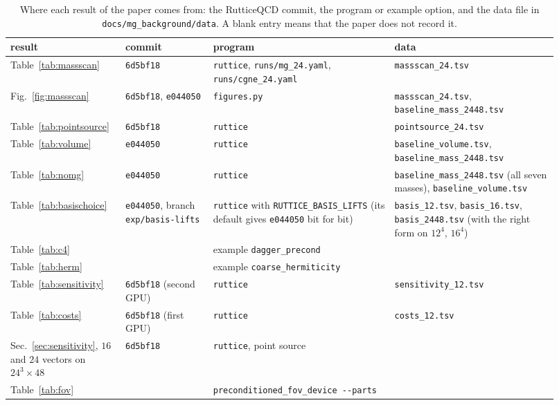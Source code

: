 \begin{table}[h]
\centering
\caption{Where each result of the paper comes from: the RutticeQCD commit, the program or
example option, and the data file in \texttt{docs/mg\_background/data}. A blank entry means
that the paper does not record it.}
\label{tab:provenance}
\footnotesize
\begin{tabular}{@{}>{\raggedright\arraybackslash}p{0.17\linewidth}>{\raggedright\arraybackslash}p{0.15\linewidth}>{\raggedright\arraybackslash}p{0.31\linewidth}>{\raggedright\arraybackslash}p{0.29\linewidth}@{}}
\toprule
result & commit & program & data\\
\midrule
Table~\ref{tab:massscan} & \texttt{6d5bf18} & \texttt{ruttice}, \texttt{runs/mg\_24.yaml}, \texttt{runs/cgne\_24.yaml} & \texttt{massscan\_24.tsv}\\
Fig.~\ref{fig:massscan} & \texttt{6d5bf18}, \texttt{e044050} & \texttt{figures.py} & \texttt{massscan\_24.tsv}, \texttt{baseline\_mass\_2448.tsv}\\
Table~\ref{tab:pointsource} & \texttt{6d5bf18} & \texttt{ruttice} & \texttt{pointsource\_24.tsv}\\
Table~\ref{tab:volume} & \texttt{e044050} & \texttt{ruttice} & \texttt{baseline\_volume.tsv}, \texttt{baseline\_mass\_2448.tsv}\\
Table~\ref{tab:nomg} & \texttt{e044050} & \texttt{ruttice} & \texttt{baseline\_mass\_2448.tsv} (all seven masses), \texttt{baseline\_volume.tsv}\\
Table~\ref{tab:basischoice} & \texttt{e044050}, branch \texttt{exp/\allowbreak basis-lifts} & \texttt{ruttice} with \texttt{RUTTICE\_\allowbreak BASIS\_\allowbreak LIFTS} (its default gives \texttt{e044050} bit for bit) & \texttt{basis\_12.tsv}, \texttt{basis\_16.tsv}, \texttt{basis\_2448.tsv} (with the right form on $12^4$, $16^4$)\\
Table~\ref{tab:c4} & & example \texttt{dagger\_precond} & \\
Table~\ref{tab:herm} & & example \texttt{coarse\_hermiticity} & \\
Table~\ref{tab:sensitivity} & \texttt{6d5bf18} (second GPU) & \texttt{ruttice} & \texttt{sensitivity\_12.tsv}\\
Table~\ref{tab:costs} & \texttt{6d5bf18} (first GPU) & \texttt{ruttice} & \texttt{costs\_12.tsv}\\
Sec.~\ref{sec:sensitivity}, $16$ and $24$ vectors on $24^3\times48$ & \texttt{6d5bf18} & \texttt{ruttice}, point source & \\
Table~\ref{tab:fov} & & \texttt{preconditioned\_fov\_device -{}-parts} & \\

\end{tabular}
\end{table}
